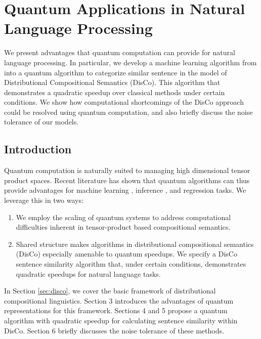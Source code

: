 \chapter{\color{blue} Quantum Applications in Natural Language Processing}
\label{chap:qDisCo}

\begin{chapabstract}
        We present advantages that quantum computation can provide for natural language processing.  In particular, we develop a machine learning algorithm from \cite{wiebe2012quantum} into a quantum algorithm to categorize similar sentence in the model of Distributional Compositional Semantics (DisCo). This algorithm that demonstrates a quadratic speedup over classical methods under certain conditions. We show how computational shortcomings of the  DisCo approach could be resolved using quantum computation, and also briefly discuss the noise tolerance of our models.
\end{chapabstract}

\section{Introduction}

Quantum computation is naturally suited to managing high dimensional tensor product spaces. Recent literature has shown that quantum algorithms can thus provide advantages for machine learning \cite{rebentrost2014quantum}\cite{wiebe2014quantum}\cite{wiebe2014quantumDeepLearning}, inference \cite{low2014quantum}, and regression \cite{wang2014quantum}\cite{wiebe2012quantum} tasks.  We leverage this in two ways:
\begin{enumerate}
\item We employ the scaling of quantum systems to address computational difficulties inherent in tensor-product based compositional semantics.
\item Shared structure makes algorithms in distributional compositional semantics (DisCo)\cite{clark2008compositional} especially amenable to quantum speedups.  We specify a DisCo sentence similarity algorithm that, under certain conditions, demonstrates quadratic speedups for natural language tasks.
\end{enumerate}

In Section \ref{sec:disco}, we cover the basic framework of distributional compositional linguistics. Section 3 introduces the advantages of quantum representations for this framework.  Sections 4 and 5 propose a quantum algorithm with quadratic speedup for calculating sentence similarity within DisCo. Section 6 briefly discusses the noise tolerance of these methods.

